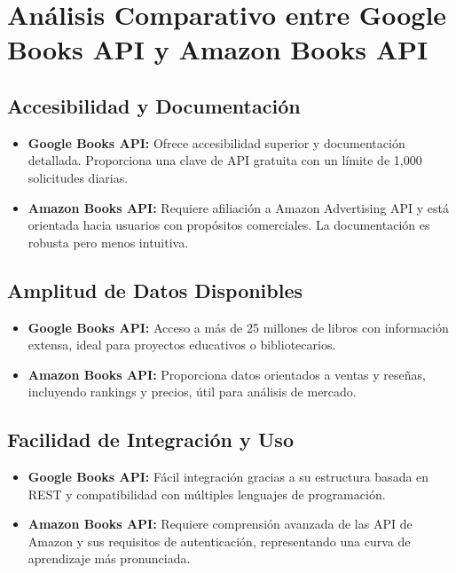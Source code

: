 
\section{Análisis Comparativo entre Google Books API y Amazon Books API}

\subsection{Accesibilidad y Documentación}
\begin{itemize}
    \item \textbf{Google Books API:} Ofrece accesibilidad superior y documentación detallada. Proporciona una clave de API gratuita con un límite de 1,000 solicitudes diarias.
    \item \textbf{Amazon Books API:} Requiere afiliación a Amazon Advertising API y está orientada hacia usuarios con propósitos comerciales. La documentación es robusta pero menos intuitiva.
\end{itemize}

\subsection{Amplitud de Datos Disponibles}
\begin{itemize}
    \item \textbf{Google Books API:} Acceso a más de 25 millones de libros con información extensa, ideal para proyectos educativos o bibliotecarios.
    \item \textbf{Amazon Books API:} Proporciona datos orientados a ventas y reseñas, incluyendo rankings y precios, útil para análisis de mercado.
\end{itemize}

\subsection{Facilidad de Integración y Uso}
\begin{itemize}
    \item \textbf{Google Books API:} Fácil integración gracias a su estructura basada en REST y compatibilidad con múltiples lenguajes de programación.
    \item \textbf{Amazon Books API:} Requiere comprensión avanzada de las API de Amazon y sus requisitos de autenticación, representando una curva de aprendizaje más pronunciada.
\end{itemize}

